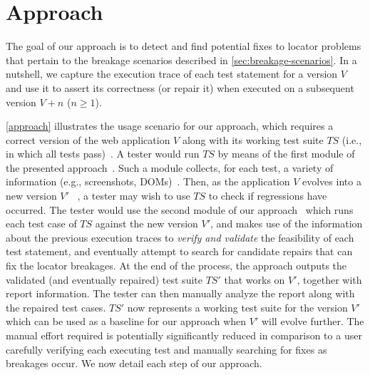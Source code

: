 \section{Approach}\label{sec:approach}

The goal of our approach is to
detect and find potential fixes to locator problems that pertain to the breakage scenarios described in \autoref{sec:breakage-scenarios}.
%
%
In a nutshell, we capture the execution trace of each test statement for a version $V$ and use it to assert its correctness (or repair it) when executed on a subsequent version $V+n$ ($n \geq 1$). 

\autoref{approach} illustrates the usage scenario for our approach, which requires a correct version of the web application $V$ along with its working test suite $TS$ (i.e., in which all tests pass)~. 
A tester would run $TS$ by means of the first module of the presented approach~. Such a module collects, for each test, a variety of information (e.g., screenshots, DOMs)~. 
Then, as the application $V$ evolves into a new version $V'$ ~, a tester may wish to use $TS$ to check if regressions have occurred. The tester would use the second module of our approach~ which runs each test case of $TS$ against the new version $V'$, and makes use of the information about the previous execution traces to \textit{verify and validate} the feasibility of each test statement, and eventually attempt to search for candidate repairs that can fix the locator breakages. At the end of the process, the approach outputs the validated (and eventually repaired) test suite $TS'$ that works on $V'$, together with report information. 
The tester can then manually analyze the report along with the repaired test cases. $TS'$ now represents a working test suite for the version $V'$ which can be used as a baseline for our approach when $V'$ will evolve further. 
The manual effort required is potentially significantly reduced in comparison to a user carefully verifying each executing test and manually searching for fixes as breakages occur. %
We now detail each step of our approach. 

